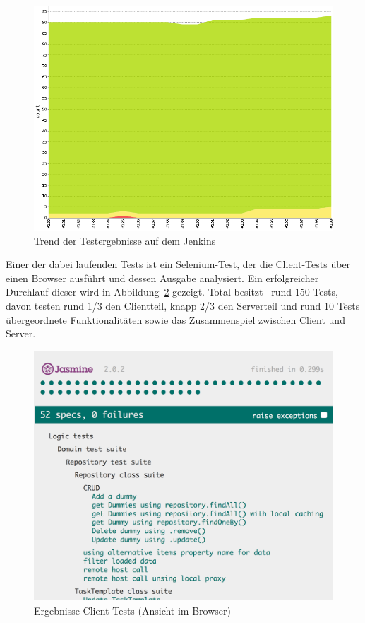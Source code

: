 			\begin{figure}[H]
				\includegraphics[width=\linewidth]{projectPlan/media/img/jenkinsTrend.png}
				\centering
				\caption{Trend der Testergebnisse auf dem Jenkins}
				\label{fig:jenkinsTrend}
			\end{figure}
			
			Einer der dabei laufenden Tests ist ein Selenium-Test, der die Client-Tests über einen Browser ausführt und dessen Ausgabe analysiert.
			Ein erfolgreicher Durchlauf dieser wird in Abbildung~\ref{fig:clientTestResult} gezeigt.
			Total besitzt \eeppi\ rund 150 Tests, davon testen rund 1/3 den Clientteil, knapp 2/3 den Serverteil
			und rund 10 Tests übergeordnete Funktionalitäten sowie das Zusammenspiel zwischen Client und Server.
			
			\begin{figure}[H]
				\includegraphics[width=0.8\linewidth]{projectPlan/media/img/clientTestResult.png}
				\centering
				\caption{Ergebnisse Client-Tests (Ansicht im Browser)}
				\label{fig:clientTestResult}
			\end{figure}
